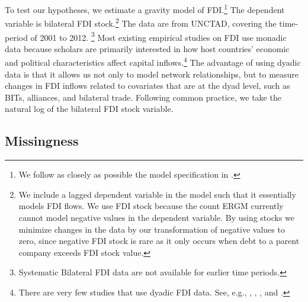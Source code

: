 \documentclass[reqno,onecolumn,letterpaper,12pt]{article}
\begin{document}
To test our hypotheses, we estimate a gravity model of FDI.\footnote{We follow as closely as possible the model specification in \citet{Li_Vashchilko:2010}.} The dependent variable is bilateral FDI stock.\footnote{We include a lagged dependent variable in the model such that it essentially models FDI flows. We use FDI stock because the count ERGM currently cannot model negative values in the dependent variable. By using stocks we minimize changes in the data by our transformation of negative values to zero, since negative FDI stock is rare as it only occurs when debt to a parent company exceeds FDI stock value.} The data are from UNCTAD, covering the time-period of 2001 to 2012.%
\footnote{Systematic Bilateral FDI data are not available for earlier time periods.} Most existing empirical studies on FDI use monadic data because scholars are primarily interested in how host countries' economic and political characteristics affect capital inflows.\footnote{There are very few studies that use dyadic FDI data. See, e.g., \citet{Frenkel_et_al:2004}, \citet{Leblang:2010}, \citet{Li_Vashchilko:2010}, and \citet{Razin_et_al:2005}. } The advantage of using dyadic data is that it allows us not only to model network relationships, but to measure changes in FDI inflows related to covariates that are at the dyad level, such as BITs, alliances, and bilateral trade. Following common practice, we take the natural log of the bilateral FDI stock variable.

\subsection{Missingness}\label{missingness}
\end{document}
